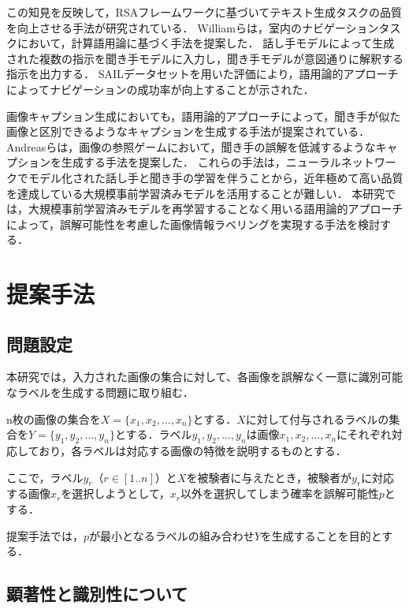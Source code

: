 \documentclass[a4paper,11pt]{jreport}
\begin{document}
この知見を反映して，RSAフレームワークに基づいてテキスト生成タスクの品質を向上させる手法が研究されている\cite{Fried2017}．
Williamら\cite{Williams2015}は，室内のナビゲーションタスクにおいて，計算語用論に基づく手法を提案した．
話し手モデルによって生成された複数の指示を聞き手モデルに入力し，聞き手モデルが意図通りに解釈する指示を出力する．
SAILデータセットを用いた評価により，語用論的アプローチによってナビゲーションの成功率が向上することが示された．

画像キャプション生成においても，語用論的アプローチによって，聞き手が似た画像と区別できるようなキャプションを生成する手法が提案されている\cite{Vedantam2017,Cohn-Gordon2018,Nie2020}．
Andreasら\cite{Andreas2016}は，画像の参照ゲームにおいて，聞き手の誤解を低減するようなキャプションを生成する手法を提案した．
これらの手法は，ニューラルネットワークでモデル化された話し手と聞き手の学習を伴うことから，近年極めて高い品質を達成している大規模事前学習済みモデルを活用することが難しい．
本研究では，大規模事前学習済みモデルを再学習することなく用いる語用論的アプローチによって，誤解可能性を考慮した画像情報ラベリングを実現する手法を検討する．

\chapter{提案手法}

\section{問題設定}

本研究では，入力された画像の集合に対して、各画像を誤解なく一意に識別可能なラベルを生成する問題に取り組む．

n枚の画像の集合を\(X = \{x_1, x_2, \ldots, x_n\}\)とする．\(X\)に対して付与されるラベルの集合を\(Y = \{y_1, y_2, \ldots, y_n\}\)とする．ラベル\(y_1, y_2, \ldots, y_n\)は画像\(x_1, x_2, \ldots, x_n\)にそれぞれ対応しており，各ラベルは対応する画像の特徴を説明するものとする．

ここで，ラベル\(y_r\)（$r \in [1..n]$）と\(X\)を被験者に与えたとき，被験者が\(y_r\)に対応する画像\(x_r\)を選択しようとして，\(x_r\)以外を選択してしまう確率を誤解可能性\(p\)とする．

提案手法では，\(p\)が最小となるラベルの組み合わせ\(Y\)を生成することを目的とする．

\section{顕著性と識別性について}
\end{document}
